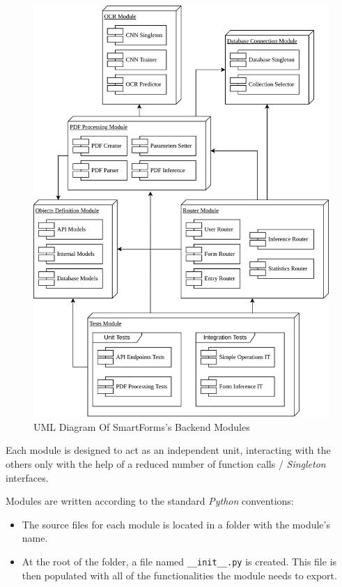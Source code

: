 \documentclass[12pt, a4paper]{report}
\def\code#1{\texttt{#1}}
\begin{document}
\begin{figure}[!h]
    \centering
    \includegraphics[width=37em]{images/diagrams/ProjectModulesDiagram.png}
    \caption{UML Diagram Of SmartForms's Backend Modules}
    \label{fig:label}
\end{figure}

Each module is designed to act as an independent unit, interacting with the others only with the help of a reduced number of function calls / \textit{Singleton} interfaces.

Modules are written according to the standard \textit{Python} conventions:
\begin{itemize}
    \item The source files for each module is located in a folder with the module's name.
    \item At the root of the folder, a file named \code{\_\_init\_\_.py} is created. This file is then populated with all of the functionalities the module needs to export.
\end{itemize}
\end{document}
